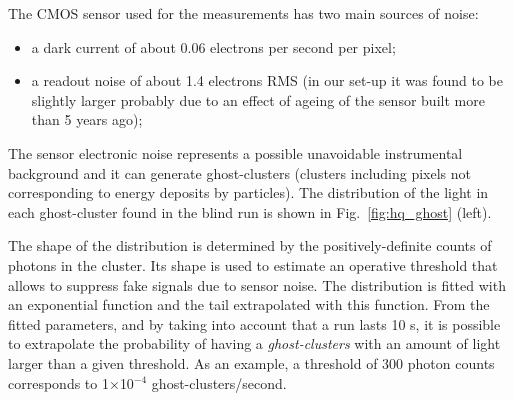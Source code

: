\documentclass[a4paper]{jpconf}
\begin{document}
The CMOS sensor used for the measurements has two main sources of noise: 
\begin{itemize}
    \item a dark current of about 0.06 electrons per second per pixel;
    \item a readout noise of about 1.4 electrons RMS (in our set-up it
      was found to be slightly larger probably due to an effect of
      ageing of the sensor built more than 5 years ago);
\end{itemize}

The sensor electronic noise represents a possible unavoidable
instrumental background and it can generate ghost-clusters (clusters
including pixels not corresponding to energy deposits by particles).
The distribution of the light in each ghost-cluster found in the blind
run is shown in Fig.~\ref{fig:hq_ghost} (left).

The shape of the distribution is determined by the positively-definite
counts of photons in the cluster. Its shape is used to estimate an
operative threshold that allows to suppress fake signals due to sensor
noise. The distribution is fitted with an exponential function and the
tail extrapolated with this function.  From the fitted parameters, and
by taking into account that a run lasts 10 s, it is possible to
extrapolate the probability of having a {\it ghost-clusters} with an
amount of light larger than a given threshold. As an example, a
threshold of 300 photon counts corresponds to 1$\times$10$^{-4}$
  ghost-clusters/second.
\end{document}
